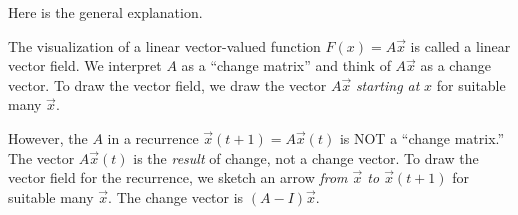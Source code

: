 \documentclass[../main.tex]{subfiles}
\begin{document}
Here is the general explanation.

The visualization of a linear vector-valued function \(F(x) = A \vec{x}\) is called a linear vector field.  We interpret \(A\) as a ``change matrix'' and think of \(A \vec{x}\) as a change vector.  To draw the vector field, we draw the vector \(A \vec{x}\) \emph{starting at} \(x\) for suitable many \(\vec{x}\).

However, the \(A\) in a recurrence \(\vec{x}(t+1) = A \vec{x}(t)\) is NOT a ``change matrix.'' The vector \(A \vec{x}(t)\) is the \emph{result} of change, not a change vector. To draw the vector field for the recurrence, we sketch an arrow \emph{from \(\vec{x}\) to \(\vec{x}(t+1)\)} for suitable many \(\vec{x}\). The change vector is \((A - I) \vec{x}\).
\end{document}
